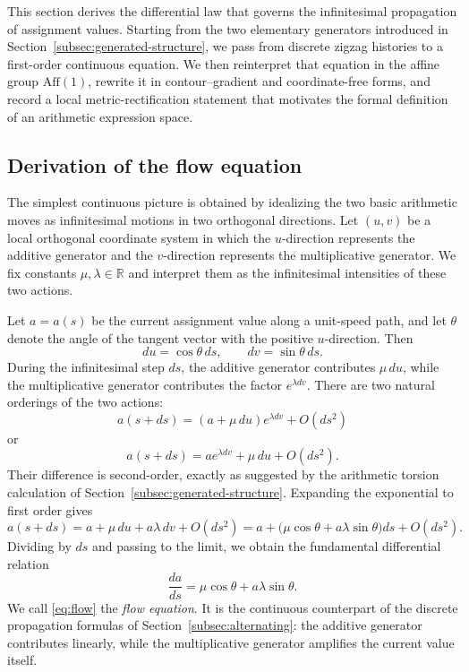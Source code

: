 This section derives the differential law that governs the infinitesimal propagation of assignment values. Starting from the two elementary generators introduced in Section~\ref{subsec:generated-structure}, we pass from discrete zigzag histories to a first-order continuous equation. We then reinterpret that equation in the affine group $\mathrm{Aff}(1)$, rewrite it in contour--gradient and coordinate-free forms, and record a local metric-rectification statement that motivates the formal definition of an arithmetic expression space.

\subsection{Derivation of the flow equation}\label{sec:equation}

The simplest continuous picture is obtained by idealizing the two basic arithmetic moves as infinitesimal motions in two orthogonal directions. Let $(u,v)$ be a local orthogonal coordinate system in which the $u$-direction represents the additive generator and the $v$-direction represents the multiplicative generator. We fix constants $\mu,\lambda\in\mathbb{R}$ and interpret them as the infinitesimal intensities of these two actions.

Let $a=a(s)$ be the current assignment value along a unit-speed path, and let $\theta$ denote the angle of the tangent vector with the positive $u$-direction. Then
\[
    du = \cos\theta\,ds,
    \qquad
    dv = \sin\theta\,ds.
\]
During the infinitesimal step $ds$, the additive generator contributes $\mu\,du$, while the multiplicative generator contributes the factor $e^{\lambda dv}$. There are two natural orderings of the two actions:
\[
    a(s+ds) = (a + \mu\,du)e^{\lambda dv} + O(ds^2)
\]
or
\[
    a(s+ds) = a e^{\lambda dv} + \mu\,du + O(ds^2).
\]
Their difference is second-order, exactly as suggested by the arithmetic torsion calculation of Section~\ref{subsec:generated-structure}. Expanding the exponential to first order gives
\[
    a(s+ds) = a + \mu\,du + a\lambda\,dv + O(ds^2)
            = a + \bigl(\mu\cos\theta + a\lambda\sin\theta\bigr)ds + O(ds^2).
\]
Dividing by $ds$ and passing to the limit, we obtain the fundamental differential relation
\begin{equation}
    \frac{da}{ds} = \mu \cos \theta + a \lambda \sin \theta.
    \label{eq:flow}
\end{equation}
We call \eqref{eq:flow} the \emph{flow equation}. It is the continuous counterpart of the discrete propagation formulas of Section~\ref{subsec:alternating}: the additive generator contributes linearly, while the multiplicative generator amplifies the current value itself.

